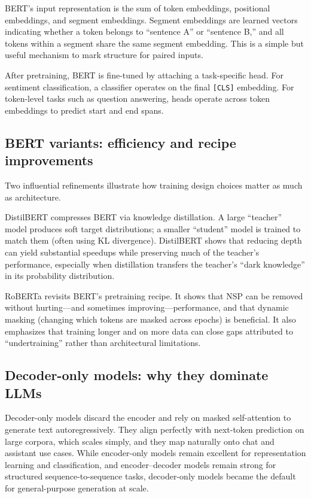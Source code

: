 BERT’s input representation is the sum of token embeddings, positional embeddings, and segment embeddings. Segment embeddings are learned vectors indicating whether a token belongs to “sentence A” or “sentence B,” and all tokens within a segment share the same segment embedding. This is a simple but useful mechanism to mark structure for paired inputs.

After pretraining, BERT is fine-tuned by attaching a task-specific head. For sentiment classification, a classifier operates on the final \texttt{[CLS]} embedding. For token-level tasks such as question answering, heads operate across token embeddings to predict start and end spans.

\subsection{BERT variants: efficiency and recipe improvements}
Two influential refinements illustrate how training design choices matter as much as architecture.

DistilBERT compresses BERT via knowledge distillation. A large “teacher” model produces soft target distributions; a smaller “student” model is trained to match them (often using KL divergence). DistilBERT shows that reducing depth can yield substantial speedups while preserving much of the teacher’s performance, especially when distillation transfers the teacher’s “dark knowledge” in its probability distribution.

RoBERTa revisits BERT’s pretraining recipe. It shows that NSP can be removed without hurting—and sometimes improving—performance, and that dynamic masking (changing which tokens are masked across epochs) is beneficial. It also emphasizes that training longer and on more data can close gaps attributed to “undertraining” rather than architectural limitations.

\subsection{Decoder-only models: why they dominate LLMs}
Decoder-only models discard the encoder and rely on masked self-attention to generate text autoregressively. They align perfectly with next-token prediction on large corpora, which scales simply, and they map naturally onto chat and assistant use cases. While encoder-only models remain excellent for representation learning and classification, and encoder--decoder models remain strong for structured sequence-to-sequence tasks, decoder-only models became the default for general-purpose generation at scale.

